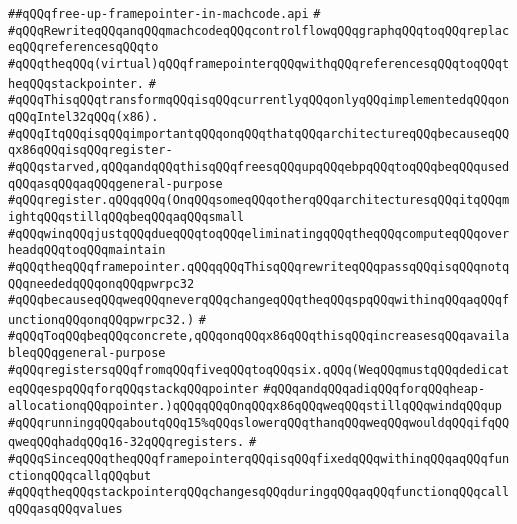 \label{src/lib/compiler/back/low/omit-framepointer/free-up-framepointer-in-machcode.api}
\verb|##qQQqfree-up-framepointer-in-machcode.api|\newline
\verb|#|\newline
\verb|#qQQqRewriteqQQqanqQQqmachcodeqQQqcontrolflowqQQqgraphqQQqtoqQQqreplaceqQQqreferencesqQQqto|\newline
\verb|#qQQqtheqQQq(virtual)qQQqframepointerqQQqwithqQQqreferencesqQQqtoqQQqtheqQQqstackpointer.|\newline
\verb|#|\newline
\verb|#qQQqThisqQQqtransformqQQqisqQQqcurrentlyqQQqonlyqQQqimplementedqQQqonqQQqIntel32qQQq(x86).|\newline
\verb|#qQQqItqQQqisqQQqimportantqQQqonqQQqthatqQQqarchitectureqQQqbecauseqQQqx86qQQqisqQQqregister-|\newline
\verb|#qQQqstarved,qQQqandqQQqthisqQQqfreesqQQqupqQQqebpqQQqtoqQQqbeqQQqusedqQQqasqQQqaqQQqgeneral-purpose|\newline
\verb|#qQQqregister.qQQqqQQq(OnqQQqsomeqQQqotherqQQqarchitecturesqQQqitqQQqmightqQQqstillqQQqbeqQQqaqQQqsmall|\newline
\verb|#qQQqwinqQQqjustqQQqdueqQQqtoqQQqeliminatingqQQqtheqQQqcomputeqQQqoverheadqQQqtoqQQqmaintain|\newline
\verb|#qQQqtheqQQqframepointer.qQQqqQQqThisqQQqrewriteqQQqpassqQQqisqQQqnotqQQqneededqQQqonqQQqpwrpc32|\newline
\verb|#qQQqbecauseqQQqweqQQqneverqQQqchangeqQQqtheqQQqspqQQqwithinqQQqaqQQqfunctionqQQqonqQQqpwrpc32.)|\newline
\verb|#|\newline
\verb|#qQQqToqQQqbeqQQqconcrete,qQQqonqQQqx86qQQqthisqQQqincreasesqQQqavailableqQQqgeneral-purpose|\newline
\verb|#qQQqregistersqQQqfromqQQqfiveqQQqtoqQQqsix.qQQq(WeqQQqmustqQQqdedicateqQQqespqQQqforqQQqstackqQQqpointer|\newline
\verb|#qQQqandqQQqadiqQQqforqQQqheap-allocationqQQqpointer.)qQQqqQQqOnqQQqx86qQQqweqQQqstillqQQqwindqQQqup|\newline
\verb|#qQQqrunningqQQqaboutqQQq15%qQQqslowerqQQqthanqQQqweqQQqwouldqQQqifqQQqweqQQqhadqQQq16-32qQQqregisters.|\newline
\verb|#|\newline
\verb|#qQQqSinceqQQqtheqQQqframepointerqQQqisqQQqfixedqQQqwithinqQQqaqQQqfunctionqQQqcallqQQqbut|\newline
\verb|#qQQqtheqQQqstackpointerqQQqchangesqQQqduringqQQqaqQQqfunctionqQQqcallqQQqasqQQqvalues|\newline
